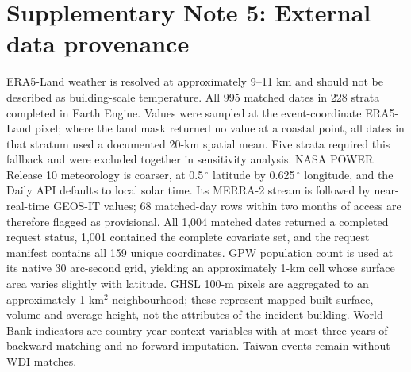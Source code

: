 \documentclass[11pt]{article}
\begin{document}
\section*{Supplementary Note 5: External data provenance}
ERA5-Land weather is resolved at approximately 9--11 km and should not be described as building-scale temperature. All 995 matched dates in 228 strata completed in Earth Engine. Values were sampled at the event-coordinate ERA5-Land pixel; where the land mask returned no value at a coastal point, all dates in that stratum used a documented 20-km spatial mean. Five strata required this fallback and were excluded together in sensitivity analysis. NASA POWER Release 10 meteorology is coarser, at 0.5\,$^\circ$ latitude by 0.625\,$^\circ$ longitude, and the Daily API defaults to local solar time. Its MERRA-2 stream is followed by near-real-time GEOS-IT values; 68 matched-day rows within two months of access are therefore flagged as provisional. All 1,004 matched dates returned a completed request status, 1,001 contained the complete covariate set, and the request manifest contains all 159 unique coordinates. GPW population count is used at its native 30 arc-second grid, yielding an approximately 1-km cell whose surface area varies slightly with latitude. GHSL 100-m pixels are aggregated to an approximately 1-km$^2$ neighbourhood; these represent mapped built surface, volume and average height, not the attributes of the incident building. World Bank indicators are country-year context variables with at most three years of backward matching and no forward imputation. Taiwan events remain without WDI matches.
\end{document}
